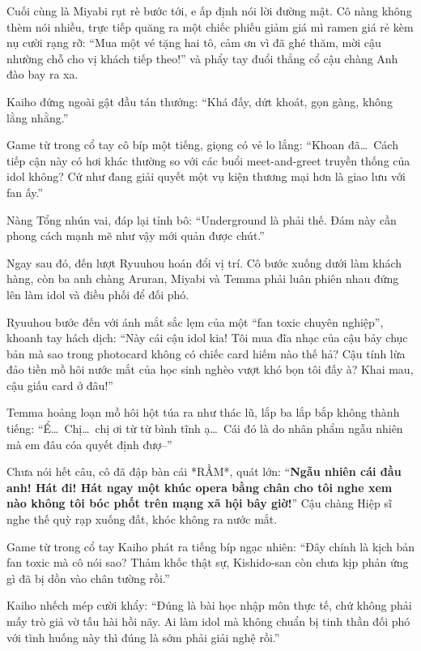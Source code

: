 \documentclass[../main.tex]{subfiles}
\begin{document}
Cuối cùng là Miyabi rụt rè bước tới, e ấp định nói lời đường mật. Cô nàng không thèm nói nhiều, trực tiếp quăng ra một chiếc phiếu giảm giá mì ramen giá rẻ kèm nụ cười rạng rỡ: ``Mua một vé tặng hai tô, cảm ơn vì đã ghé thăm, mời cậu nhường chỗ cho vị khách tiếp theo!'' và phẩy tay đuổi thẳng cổ cậu chàng Anh đào bay ra xa.

Kaiho đứng ngoài gật đầu tán thưởng: ``Khá đấy, dứt khoát, gọn gàng, không lằng nhằng.''

Game từ trong cổ tay cô bíp một tiếng, giọng có vẻ lo lắng: ``Khoan đã\dots\ Cách tiếp cận này có hơi khác thường so với các buổi meet-and-greet truyền thống của idol không? Cứ như đang giải quyết một vụ kiện thương mại hơn là giao lưu với fan ấy.''

Nàng Tổng nhún vai, đáp lại tỉnh bô: ``Underground là phải thế. Đám này cần phong cách mạnh mẽ như vậy mới quản được chút.''

\ct

Ngay sau đó, đến lượt Ryuuhou hoán đổi vị trí. Cô bước xuống dưới làm khách hàng, còn ba anh chàng Aruran, Miyabi và Temma phải luân phiên nhau đứng lên làm idol và điều phối để đối phó.

Ryuuhou bước đến với ánh mắt sắc lẹm của một ``fan toxic chuyên nghiệp'', khoanh tay hách dịch: ``Này cái cậu idol kia! Tôi mua đĩa nhạc của cậu bảy chục bản mà sao trong photocard không có chiếc card hiếm nào thế hả? Cậu tính lừa đảo tiền mồ hôi nước mắt của học sinh nghèo vượt khó bọn tôi đấy à? Khai mau, cậu giấu card ở đâu!''

Temma hoảng loạn mồ hôi hột túa ra như thác lũ, lắp ba lắp bắp không thành tiếng: ``Ể\dots\ Chị\dots\ chị ơi từ từ bình tĩnh ạ\dots\ Cái đó là do nhân phẩm ngẫu nhiên mà em đâu cóa quyết định đượ--''

Chưa nói hết câu, cô đã đập bàn cái *RẦM*, quát lớn: ``\textbf{Ngẫu nhiên cái đầu anh! Hát đi! Hát ngay một khúc opera bằng chân cho tôi nghe xem nào không tôi bóc phốt trên mạng xã hội bây giờ!}'' Cậu chàng Hiệp sĩ nghe thế quỳ rạp xuống đất, khóc không ra nước mắt.

Game từ trong cổ tay Kaiho phát ra tiếng bíp ngạc nhiên: ``Đây chính là kịch bản fan toxic mà cô nói sao? Thảm khốc thật sự, Kishido-san còn chưa kịp phản ứng gì đã bị dồn vào chân tường rồi.''

Kaiho nhếch mép cười khẩy: ``Đúng là bài học nhập môn thực tế, chứ không phải mấy trò giả vờ tấu hài hồi nãy. Ai làm idol mà không chuẩn bị tinh thần đối phó với tình huống này thì đúng là sớm phải giải nghệ rồi.''
\end{document}
